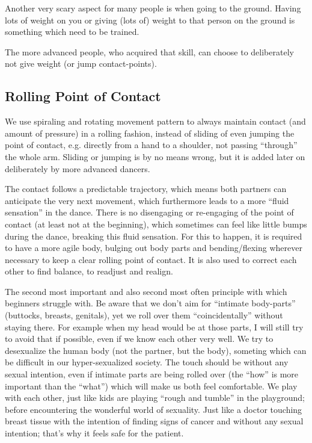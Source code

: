 Another very scary aspect for many people is when going to the ground.
Having lots of weight on you or giving (lots of) weight to that person on the ground is something which need to be trained.

The more advanced people, who acquired that skill, can choose to deliberately not give weight (or jump contact-points).

\subsection{Rolling Point of Contact}\label{subsec:rolling-point-of-contact}

We use spiraling and rotating movement pattern to always maintain contact (and amount of pressure) in a rolling fashion, instead of sliding of even jumping the point of contact, e.g. directly from a hand to a shoulder, not passing ``through'' the whole arm.
Sliding or jumping is by no means wrong, but it is added later on deliberately by more advanced dancers.

The contact follows a predictable trajectory, which means both partners can anticipate the very next movement, which furthermore leads to a more ``fluid sensation'' in the dance.
There is no disengaging or re-engaging of the point of contact (at least not at the beginning), which sometimes can feel like little bumps during the dance, breaking this fluid sensation.
For this to happen, it is required to have a more agile body, bulging out body parts and bending/flexing wherever necessary to keep a clear rolling point of contact.
It is also used to correct each other to find balance, to readjust and realign.

The second most important and also second most often principle with which beginners struggle with.
Be aware that we don't aim for ``intimate body-parts'' (buttocks, breasts, genitals), yet we roll over them ``coincidentally'' without staying there.
For example when my head would be at those parts, I will still try to avoid that if possible, even if we know each other very well.
We try to desexualize the human body (not the partner, but the body), someting which can be difficult in our hyper-sexualized society.
The touch should be without any sexual intention, even if intimate parts are being rolled over (the ``how'' is more important than the ``what'') which will make us both feel comfortable.
We play with each other, just like kids are playing ``rough and tumble'' in the playground;
before encountering the wonderful world of sexuality.
Just like a doctor touching breast tissue with the intention of finding signs of cancer and without any sexual intention;
that's why it feels safe for the patient.



